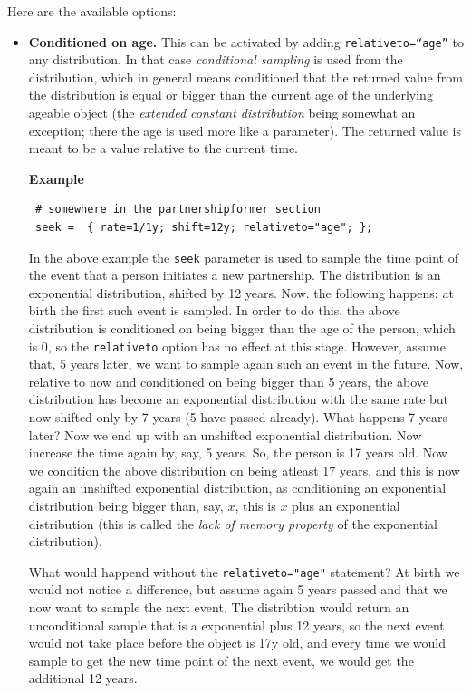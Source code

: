 \documentclass[11pt]{article}
\newenvironment{example}{\par\smallskip\noindent\begingroup\small\textbf{\small Example\enskip}}{\endgroup\par\smallskip}
\begin{document}
Here are the available options:
\begin{itemize}
\item\textbf{Conditioned on age.} This can be activated by adding
\texttt{relativeto=``age''} to any distribution. In that case \emph{conditional
sampling} is used from the distribution, which in general means conditioned that
the returned value from the distribution is equal or bigger than the current age
of the underlying ageable object (the \emph{extended constant distribution}
being somewhat an exception; there the age is used more like a parameter). The
returned value is meant to be a value relative to the current time. 
\begin{example}
\begin{verbatim}
 # somewhere in the partnershipformer section
 seek =  { rate=1/1y; shift=12y; relativeto="age"; };
\end{verbatim}
In the above example the \texttt{seek} parameter is used to sample the
time point of the event that a person initiates a new partnership. The
distribution is an exponential distribution, shifted by 12 years. Now. the
following happens: at birth the first such event is sampled. In order to do
this, the above distribution is conditioned on being bigger than the age of
the person, which is 0, so the \texttt{relativeto} option has no effect at this
stage. However, assume that, 5 years later, we want to sample again such an
event in the future. Now, relative to now and conditioned on being bigger than 5
years, the above distribution has become an exponential distribution with the
same rate but now shifted only by 7 years (5 have passed already). What happens
7 years later? Now we end up with an unshifted exponential distribution. Now
increase the time again by, say, 5 years. So, the person is 17 years old. Now
we condition the above distribution on being atleast 17 years, and this is now
again an unshifted exponential distribution, as conditioning an exponential
distribution being bigger than, say, $x$, this is $x$ plus an exponential
distribution (this is called the \emph{lack of memory property} of the
exponential distribution).

What would happend without the  \texttt{relativeto="age"} statement? At birth
we would not notice a difference, but assume again 5 years passed and that we
now want to sample the next event. The distribtion would return an
unconditional sample that is a exponential plus 12 years, so the next event
would not take place before the object is 17y old, and every time we would
sample to get the new time point of the next event, we would get the additional
12 years. 
\end{example}


\end{itemize}
\end{document}
